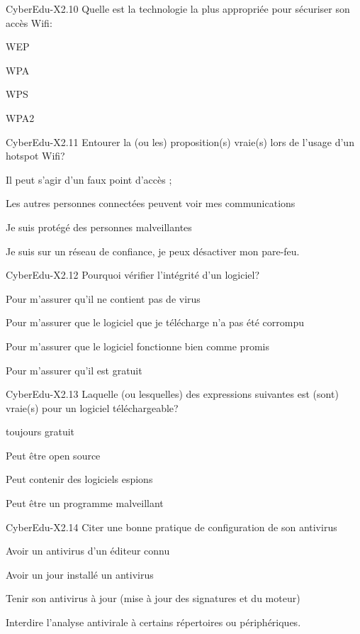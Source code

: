 \begin{multi}[multiple=true]{CyberEdu-X2.10}
	Quelle est la technologie la plus appropriée pour sécuriser son accès Wifi:
\item WEP
\item WPA
\item WPS
\item* WPA2
\end{multi}

\begin{multi}[multiple=true]{CyberEdu-X2.11}
	Entourer la (ou les) proposition(s) vraie(s) lors de l'usage d'un hotspot Wifi?
\item* Il peut s'agir d'un faux point d'accès ;
\item* Les autres personnes connectées peuvent voir mes communications
\item Je suis protégé des personnes malveillantes
\item Je suis sur un réseau de confiance, je peux désactiver mon pare-feu.
\end{multi}

\begin{multi}[multiple=true]{CyberEdu-X2.12}
	Pourquoi vérifier l'intégrité d'un logiciel?
\item Pour m'assurer qu'il ne contient pas de virus
\item* Pour m'assurer que le logiciel que je télécharge n'a pas été corrompu
\item Pour m'assurer que le logiciel fonctionne bien comme promis
\item Pour m'assurer qu'il est gratuit
\end{multi}

\begin{multi}[multiple=true]{CyberEdu-X2.13}
	Laquelle (ou lesquelles) des expressions suivantes est (sont) vraie(s) pour un logiciel téléchargeable?
\item toujours gratuit
\item* Peut être  open source
\item* Peut contenir des logiciels espions
\item* Peut être un programme malveillant
\end{multi}

\begin{multi}[multiple=true]{CyberEdu-X2.14}
	Citer une bonne pratique de configuration de son antivirus
\item Avoir un antivirus d'un éditeur connu
\item Avoir un jour installé un antivirus
\item* Tenir son antivirus à jour (mise à jour des signatures et du moteur)
\item Interdire l'analyse antivirale à certains répertoires ou périphériques.
\end{multi}

